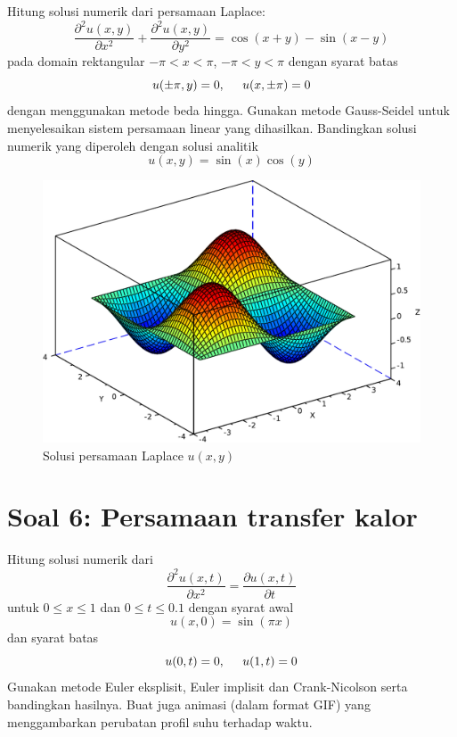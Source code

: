 \documentclass[12pt,bahasa]{article}
\begin{document}
Hitung solusi numerik dari persamaan Laplace:
\begin{equation}
\frac{\partial^2 u(x,y)}{\partial x^2} +
\frac{\partial^2 u(x,y)}{\partial y^2} = \cos(x + y) - \sin(x - y)
\end{equation}
pada domain rektangular $-\pi < x < \pi$, $-\pi < y < \pi$ dengan syarat batas
\begin{equation}
u(\pm\pi,y) = 0, \hspace{0.5cm} u(x,\pm\pi) = 0
\end{equation}
dengan menggunakan metode beda hingga. Gunakan metode Gauss-Seidel untuk
menyelesaikan sistem persamaan linear yang dihasilkan.
Bandingkan solusi numerik yang diperoleh dengan
solusi analitik
\begin{equation}
u(x,y) = \sin(x)\cos(y)
\end{equation}

\begin{figure}[H]
\centering
\includegraphics[scale=0.5]{poisson2d.pdf}
\par
\caption{Solusi persamaan Laplace $u(x,y)$}
\end{figure}


\section{Soal 6: Persamaan transfer kalor}

Hitung solusi numerik dari
\begin{equation}
\frac{\partial^2 u(x,t)}{\partial x^2} = \frac{\partial u(x,t)}{\partial t}
\end{equation}
untuk $0 \leq x \leq 1$ dan $0 \leq t \leq 0.1$ dengan syarat awal
\begin{equation}
u(x,0) = \sin(\pi x)
\end{equation}
dan syarat batas
\begin{equation}
u(0,t) = 0,\hspace{0.5cm} u(1,t) = 0
\end{equation}
Gunakan metode Euler eksplisit, Euler implisit dan Crank-Nicolson serta
bandingkan hasilnya.
Buat juga animasi (dalam format GIF) yang menggambarkan perubatan profil
suhu terhadap waktu.
\end{document}
